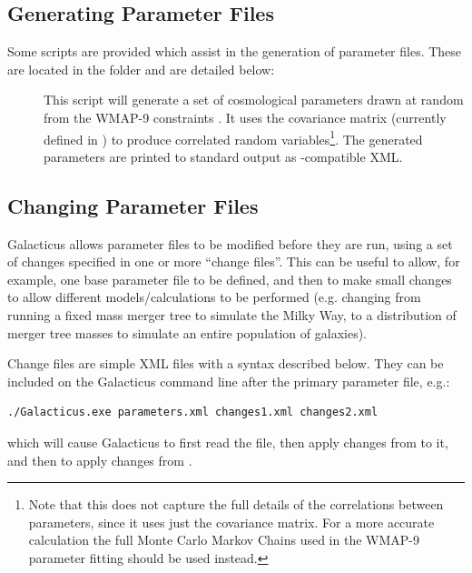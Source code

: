 \subsection{Generating Parameter Files}

Some scripts are provided which assist in the generation of parameter files. These are located in the  folder and are detailed below:
\begin{description}
\item [] This script will generate a set of cosmological parameters drawn at random from the WMAP-9 constraints \citep{hinshaw_nine-year_2012}. It uses the covariance matrix (currently defined in ) to produce correlated random variables\footnote{Note that this does not capture the full details of the correlations between parameters, since it uses just the covariance matrix. For a more accurate calculation the full Monte Carlo Markov Chains used in the WMAP-9 parameter fitting should be used instead.}. The generated parameters are printed to standard output as \glc-compatible XML.
\end{description}

\subsection{Changing Parameter Files}

Galacticus allows parameter files to be modified before they are run, using a set of changes specified in one or more ``change files''. This can be useful to allow, for example, one base parameter file to be defined, and then to make small changes to allow different models/calculations to be performed (e.g. changing from running a fixed mass merger tree to simulate the Milky Way, to a distribution of merger tree masses to simulate an entire population of galaxies).

Change files are simple XML files with a syntax described below. They can be included on the Galacticus command line after the primary parameter file, e.g.:
\begin{verbatim}
./Galacticus.exe parameters.xml changes1.xml changes2.xml
\end{verbatim}
which will cause Galacticus to first read the  file, then apply changes from  to it, and then to apply changes from .

